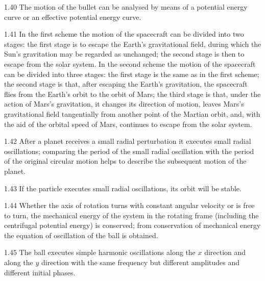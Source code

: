 \begin{hint}{1.40}
The motion of the bullet can be analysed by means of a potential energy curve or an effective potential energy curve.
\end{hint}

\begin{hint}{1.41}
In the first scheme the motion of the spacecraft can be divided into two stages: the first stage is to escape the Earth's gravitational field, during which the Sun's gravitation may be regarded as unchanged; the second stage is then to escape from the solar system. In the second scheme the motion of the spacecraft can be divided into three stages: the first stage is the same as in the first scheme; the second stage is that, after escaping the Earth's gravitation, the spacecraft flies from the Earth's orbit to the orbit of Mars; the third stage is that, under the action of Mars's gravitation, it changes its direction of motion, leaves Mars's gravitational field tangentially from another point of the Martian orbit, and, with the aid of the orbital speed of Mars, continues to escape from the solar system.
\end{hint}

\begin{hint}{1.42}
After a planet receives a small radial perturbation it executes small radial oscillations; comparing the period of the small radial oscillation with the period of the original circular motion helps to describe the subsequent motion of the planet.
\end{hint}

\begin{hint}{1.43}
If the particle executes small radial oscillations, its orbit will be stable.
\end{hint}

\begin{hint}{1.44}
Whether the axis of rotation turns with constant angular velocity or is free to turn, the mechanical energy of the system in the rotating frame (including the centrifugal potential energy) is conserved; from conservation of mechanical energy the equation of oscillation of the ball is obtained.
\end{hint}

\begin{hint}{1.45}
The ball executes simple harmonic oscillations along the $x$ direction and along the $y$ direction with the same frequency but different amplitudes and different initial phases.
\end{hint}

